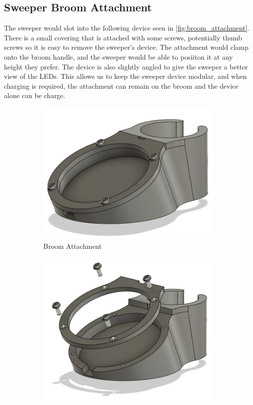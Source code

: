\documentclass{article}
\begin{document}
\subsection{Sweeper Broom Attachment}

The sweeper would slot into the following device seen in \autoref{fig:broom_attachment}. There is a small covering that is attached with some screws, potentially thumb screws so it is easy to remove the sweeper's device. The attachment would clamp onto the broom handle, and the sweeper would be able to posiiton it at any height they prefer. The device is also slightly angled to give the sweeper a better view of the LEDs. This allows us to keep the sweeper device modular, and when charging is required, the attachment can remain on the broom and the device alone can be charge. 

\begin{figure}[ht!]
    \centering
    \begin{subfigure}{0.495\textwidth}
        \includegraphics[width=\textwidth]{attachment.png}
        \caption{Broom Attachment}
        \label{fig:broom_attachment}
    \end{subfigure}
    \begin{subfigure}{0.495\textwidth}
        \includegraphics[width=\textwidth]{attachment_exploded.png}

\end{subfigure}
\end{figure}
\end{document}
